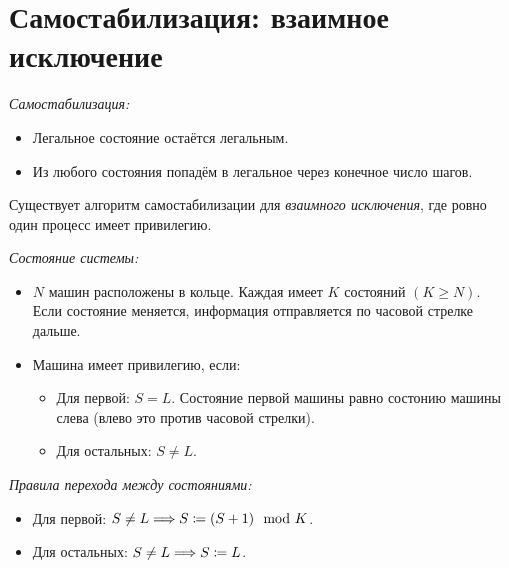 \section{Самостабилизация: взаимное исключение}

\begin{definition} \textit{Самостабилизация:}
    \begin{itemize}
        \item Легальное состояние остаётся легальным.
        \item Из любого состояния попадём в легальное через конечное число шагов.
    \end{itemize}
\end{definition}

\begin{example}
    Существует алгоритм самостабилизации для \textit{взаимного исключения}, 
    где ровно один процесс имеет привилегию.
\end{example}

\begin{definition} \textit{Состояние системы:}
    \begin{itemize}
        \item $N$ машин расположены в кольце. Каждая имеет $K$ состояний 
            $(K \geqslant N)$.
            Если состояние меняется, информация отправляется по часовой стрелке дальше.
        \item Машина имеет привилегию, если:
            \begin{itemize}
                \item Для первой: $S = L$. Состояние первой машины равно состонию 
                    машины слева (влево это против часовой стрелки).
                \item Для остальных: $S \neq L$.
            \end{itemize}
    \end{itemize}
\end{definition}

\begin{definition} \textit{Правила перехода между состояниями:}
    \begin{itemize}
        \item Для первой: $S \neq L \Longrightarrow S \coloneqq (S + 1) \mod K$.
        \item Для остальных: $S \neq L \Longrightarrow S \coloneqq L$.
    \end{itemize}
\end{definition}

